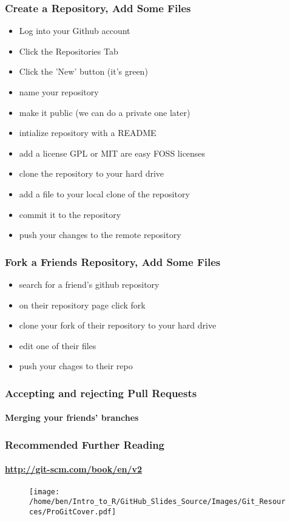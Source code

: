\documentclass[xcolor=dvipsnames]{beamer}
\begin{document}
\begin{frame}
\frametitle{Create a Repository, Add Some Files}
\begin{itemize}
\item Log into your Github account
\item Click the Repositories Tab
\item Click the 'New' button (it's green)
\item name your repository
\item make it public (we can do a private one later)
\item intialize repository with a README
\item add a license GPL or MIT are easy FOSS licenses
\item clone the repository to your hard drive
\item add a file to your local clone of the repository
\item commit it to the repository
\item push your changes to the remote repository
\end{itemize}
\end{frame}

\begin{frame}
\frametitle{Fork a Friends Repository, Add Some Files}
\begin{itemize}
\item search for a friend's github repository
\item on their repository page click fork
\item clone your fork of their repository to your hard drive
\item edit one of their files
\item push your chages to their repo
\end{itemize}
\end{frame}

\begin{frame}
\frametitle{Accepting and rejecting Pull Requests}
\framesubtitle{Merging your friends' branches}
\end{frame}

\begin{frame}
\frametitle{Recommended Further Reading}
\framesubtitle{\url{http://git-scm.com/book/en/v2}}
\begin{center}
\begin{figure}
\texttt{[image: /home/ben/Intro\_to\_R/GitHub\_Slides\_Source/Images/Git\_Resources/ProGitCover.pdf]}
\end{figure}
\cite{Chacon2014}
\end{center}

\end{frame}
\end{document}
